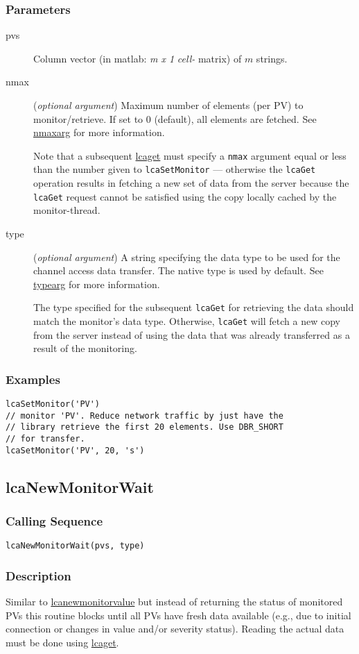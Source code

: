 \documentclass{article}
\newcommand{\com}[1]{{\tt #1}}
\newcommand{\pbrk}{\pagebreak[3]}
\newcommand{\comref}[2]{\hyperref{\com{#1}}{\com{#1} (see }{)}{#2}}
\newcommand{\ita}[1]{\emph{#1}}
\newcommand{\m}{$m$}
\newcommand{\mhack}{$m$} %
\newcommand{\mxl}{$m\times 1$}
\renewcommand{\m}{\ita{m}}
\newcommand{\mhack}{\ita{m}} %
\renewcommand{\mxl}{\ita{m x 1}}
\renewcommand{\pbrk}{}
\newcommand{\PVITEM}{
\item[pvs] Column vector (in matlab: \mxl{} \ita{cell-} matrix)
of \mhack{} strings.
}
\begin{document}
\subsubsection{Parameters}
\begin{description}
\PVITEM
\item[nmax]
(\ita{optional argument}) Maximum number of elements
(per PV) to monitor/retrieve. If set to 0 (default), all elements are fetched.
See \hyperref{here}{(}{)}{nmaxarg} for more information.

Note that a subsequent \comref{lcaGet}{lcaget} must specify a \com{nmax}
argument equal or less than the number given to \com{lcaSetMonitor} ---
otherwise the \com{lcaGet} operation results in fetching a new
set of data from the server because the \com{lcaGet} request cannot
be satisfied using the copy locally cached by the monitor-thread.
\item[type]
(\ita{optional argument}) A string specifying the
data type to be used for the channel access data transfer. The
native type is used by default.
See \hyperref{here}{(}{)}{typearg} for more information.

The type specified for the subsequent \com{lcaGet} for retrieving
the data should match the monitor's data type. Otherwise, \com{lcaGet}
will fetch a new copy from the server instead of using the data that
was already transferred as a result of the monitoring.
\end{description}
\subsubsection{Examples}
\begin{verbatim}
lcaSetMonitor('PV')
// monitor 'PV'. Reduce network traffic by just have the
// library retrieve the first 20 elements. Use DBR_SHORT
// for transfer.
lcaSetMonitor('PV', 20, 's')
\end{verbatim}

\pbrk
\subsection{lcaNewMonitorWait}
\label{lcanewmonitorwait}
\subsubsection{Calling Sequence}
\begin{verbatim}
lcaNewMonitorWait(pvs, type)
\end{verbatim}
\subsubsection{Description}
Similar to \comref{lcaNewMonitorValue}{lcanewmonitorvalue} but instead of
returning the status of monitored PVs this routine blocks until all PVs
have fresh data available (e.g., due to initial connection or changes in
value and/or severity status).
Reading the actual data must be done using \comref{lcaGet}{lcaget}.
\end{document}

